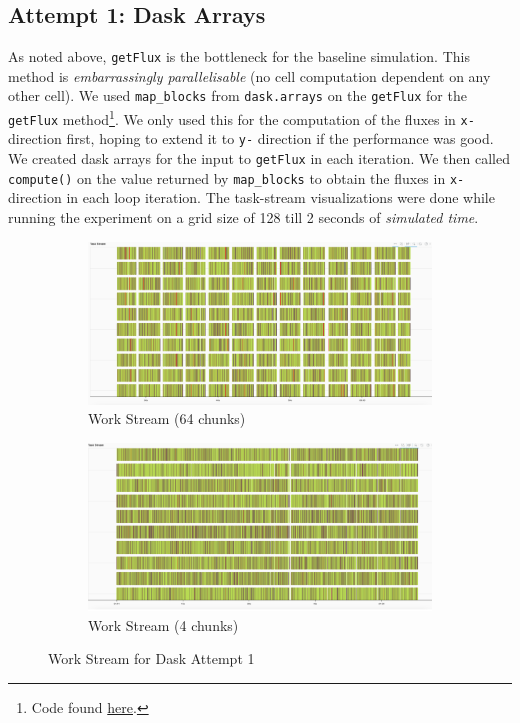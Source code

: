 \documentclass[a4paper,10pt]{article}
\begin{document}
\subsection{Attempt 1: Dask Arrays}
As noted above, \verb|getFlux| is the bottleneck for the baseline simulation.
This method is \textit{embarrassingly parallelisable} (no cell computation dependent on any other cell).
We used \verb|map_blocks| from \verb|dask.arrays| on the \verb|getFlux| for the \verb|getFlux| method\footnote{Code found \href{https://github.com/paulmyr/DD2358-HPC25/blob/master/10_project_rishi_paul/code/dask/finitevolume_dask_opt1.py}{here}.}.
We only used this for the computation of the fluxes in \verb|x-| direction first, hoping to extend it to \verb|y-| direction if the performance was good.
We created dask arrays for the input to \verb|getFlux| in each iteration.
We then called \verb|compute()| on the value returned by \verb|map_blocks| to obtain the fluxes in \verb|x-| direction in each loop iteration.
The task-stream visualizations were done while running the experiment on a grid size of 128 till 2 seconds of \emph{simulated time}.
\begin{figure}[t]
     \centering
     \begin{subfigure}[b]{0.45\textwidth}
         \centering
         \includegraphics[width=\linewidth]{images/dask/dask_opt1_n_by_8.png}
         \caption{Work Stream (64 chunks)}
         \label{fig:dask_opt1_stream_64}
     \end{subfigure}
     \hfill
     \begin{subfigure}[b]{0.45\textwidth}
        \centering
        \includegraphics[width=\linewidth]{images/dask/dask_opt1_n_by_2.png}
        \caption{Work Stream (4 chunks)}
        \label{fig:dask_opt1_stream_4}
     \end{subfigure}
     \caption{Work Stream for Dask Attempt 1}
     \label{fig:dask_opt1_stream}
\end{figure}
\end{document}
